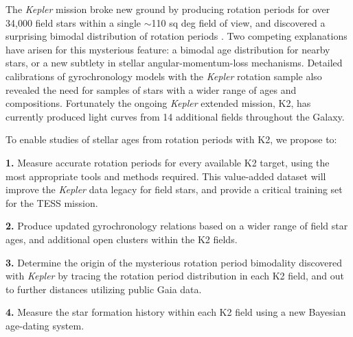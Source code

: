 \documentclass[12pt]{article}
\newcommand{\Kepler}{\textsl{Kepler}\xspace}
\begin{document}
The \Kepler mission broke new ground by producing rotation periods for over
34,000 field stars within a single $\sim$110 sq deg field of view, and
discovered a surprising bimodal distribution of rotation periods
\citep{Mcquillan2014}.
Two competing explanations have arisen for this mysterious feature: a bimodal
age distribution for nearby stars, or a new subtlety in stellar
angular-momentum-loss mechanisms.
Detailed calibrations of gyrochronology models with the \Kepler rotation
sample also revealed the need for samples of stars with a wider range of ages
and compositions.
Fortunately the ongoing \Kepler extended mission, K2, has currently produced
light curves from 14 additional fields throughout the Galaxy.

To enable studies of stellar ages from rotation periods with K2, we propose
to:

{\bf 1.} Measure accurate rotation periods for every available K2 target,
using the most appropriate tools and methods required.
This value-added dataset will improve the \Kepler data legacy for field stars,
and provide a critical training set for the TESS mission.

{\bf 2.} Produce updated gyrochronology relations based on a wider range of
field star ages, and additional open clusters within the K2 fields.

{\bf 3.} Determine the origin of the mysterious rotation period bimodality
discovered with \Kepler by tracing the rotation period distribution in each K2
field, and out to further distances utilizing public Gaia data.

{\bf 4.} Measure the star formation history within each K2 field using a new
Bayesian age-dating system.



\clearpage



\end{document}
